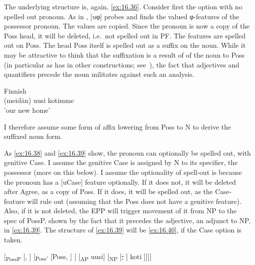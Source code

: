 \documentclass[output=paper]{langsci/langscibook}
\begin{document}
The underlying structure is, again, \eqref{ex:16.36}. Consider first the option with no
spelled out pronoun. As in , [uφ] probes and finds the valued φ-features
of the possessor pronoun. The values are copied. Since the pronoun is now a
copy of the Poss head, it will be deleted, i.e.\ not spelled out in PF. The
features are spelled out on Poss. The head Poss itself is spelled out as a
suffix on the noun. While it may be attractive to think that the suffixation is
a result of  of the noun to Poss (in particular as  has
 in other constructions; see~\citealt{HolmbergEtAl1993}), the fact that
adjectives and quantifiers precede the noun militates against such an analysis.

\ea Finnish\\\label{ex:16.39}
	(meidän) uusi kotimme\\
	'our new home'\\
\z

I therefore assume some form of affix lowering from Poss to N to derive the
suffixed noun form.

As \eqref{ex:16.38} and \eqref{ex:16.39} show, the pronoun can optionally be spelled out, with genitive
Case. I assume the genitive Case is assigned by N to its specifier, the
possessor (more on this below). I assume the optionality of spell-out is
because the pronoun has a [uCase] feature optionally. If it does not, it will
be deleted after Agree, as a copy of Poss. If it does, it will be spelled out,
as the Case-feature will rule out  (assuming that the Poss does
not have a genitive feature).  Also, if it is not deleted, the \gls{EPP} will trigger
movement of it from NP to the spec of PossP, shown by the fact that it precedes
the adjective, an adjunct to NP, in \eqref{ex:16.39}. The structure of \eqref{ex:16.39} will be \eqref{ex:16.40},
if the Case option is taken.

\ea\label{ex:16.40}
    {}[\textsubscript{PossP} [\Fpl{}, \Gen{}] [\textsubscript{Poss$'$}
        [Poss, \Fpl{}] [ [\textsubscript{AP} uusi]
        [\textsubscript{NP} [\sout{\Fpl{}, \Gen{}}] koti ]]]]
\z
\end{document}
